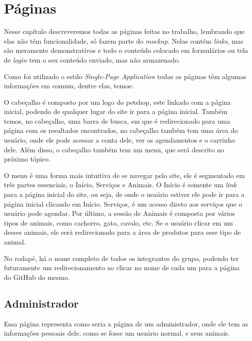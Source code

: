 \chapter{Páginas}
Nesse capítulo descreveremos todas as páginas feitas no trabalho, lembrando
que elas não têm funcionalidade, só fazem parte do \emph{mockup}. Nelas contém
\emph{links}, mas são meramente demonstrativos e todo o conteúdo colocado em
formulários ou tela de \emph{login} tem o seu conteúdo enviado, mas não
armazenado.

Como foi utilizado o estilo \emph{Single-Page Application} todas as páginas têm
algumas informações em comum, dentre elas, temos:
\begin{description}[style=nextline]
	\item [Cabeçalho]	O cabeçalho é composto por um logo do petshop, este linkado
						com a página inicial, podendo de qualquer lugar do site ir
						para a página inicial. Também temos, no cabeçalho, uma barra
						de busca, em que é redirecionado para uma página com os
						resultados encontrados, no cabeçalho também tem uma área
						do usuário, onde ele pode acessar a conta dele, ver os
						agendamentos e o carrinho dele. Além disso, o cabeçalho
						também tem um menu, que será descrito no próximo tópico.
	\item [Menu]		O menu é uma forma mais intuitiva de se navegar pelo site,
						ele é segmentado em três partes essenciais, o Início,
						Serviços e Animais. O Início é somente um \emph{link} para
						a página inicial do site, ou seja, de onde o usuário estiver
						ele pode ir para a página inicial clicando em Início.
						Serviços, é um acesso direto aos serviços que o usuário pode
						agendar. Por último, a sessão de Animais é composta por
						vários tipos de animais, como cachorro, gato, cavalo, etc.
						Se o usuário clicar em um desses animais, ele será
						redirecionado para a área de produtos para esse tipo de animal.
	\item [Rodapé]		No rodapé, há o nome completo de todos os integrantes do grupo,
						podendo ter futuramente um redirecionamento ao clicar no nome
						de cada um para a página do	GitHub do mesmo.
\end{description}

\section{Administrador}
Essa página representa como seria a página de um administrador, onde ele tem
as informações pessoais dele, como se fosse um usuário normal, e seus animais.

